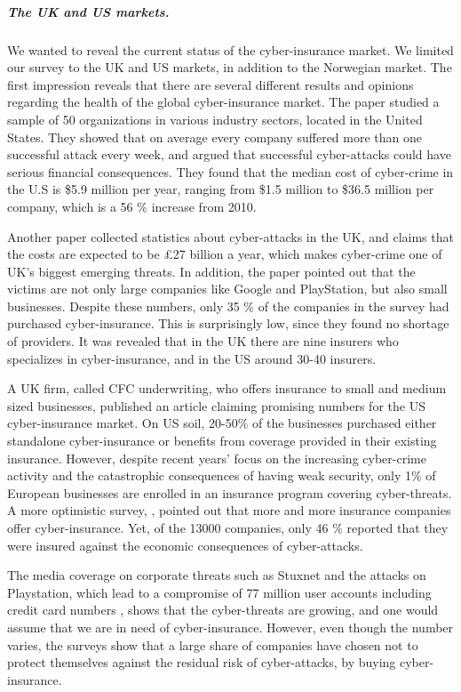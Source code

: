 \subparagraph{The UK and US markets.}
We wanted to reveal the current status of the cyber-insurance market. We limited our survey to the UK and US markets, in addition to the Norwegian market. 
The first impression reveals that there are several different results and opinions regarding the health of the global cyber-insurance market. 
The paper \cite{ccost} studied a sample of 50 organizations in various industry sectors, located in the United States. They showed that on average every company suffered more than one successful attack every week, and argued that successful cyber-attacks could have serious financial consequences. They found that the median cost of cyber-crime in the U.S is \$5.9 million per year, ranging from \$1.5 million to \$36.5 million per company, which is a 56 $\%$ increase from 2010. 
 
 Another paper \cite{evolvingcyber} collected statistics about cyber-attacks in the UK, and claims that the costs are expected to be \pounds 27 billion a year, which makes cyber-crime one of UK's biggest emerging threats. In addition, the paper pointed out that the victims are not only large companies like Google and PlayStation, but also small businesses. Despite these numbers, only 35 $\%$ of the companies in the survey had purchased cyber-insurance. This is surprisingly low, since they found no shortage of providers. It was revealed that in the UK there are nine insurers who specializes in cyber-insurance, and in the US around 30-40 insurers.  
 
 
A UK firm, called CFC underwriting, who offers insurance to small and medium sized businesses, published an article \cite{CFCunder} claiming promising numbers for the US cyber-insurance market.
On US soil, 20-50$\%$ of the businesses purchased either standalone cyber-insurance or benefits from coverage provided in their existing insurance. However, despite recent years' focus on the increasing cyber-crime activity and the catastrophic consequences of having weak security, only 1$\%$ of European businesses are enrolled in an insurance program covering cyber-threats.
A more optimistic survey, \cite{compworld}, pointed out that more and more insurance companies offer cyber-insurance. Yet, of the 13000 companies, only 46 $\%$ reported that they were insured against the economic consequences of cyber-attacks.
 
 The media coverage on corporate threats such as Stuxnet and the attacks on Playstation, which lead to a compromise of 77 million user accounts including credit card numbers \cite{playstation}, shows that the cyber-threats are growing, and one would assume that we are in need of cyber-insurance. However, even though the number varies, the surveys show that a large share of companies have chosen not to protect themselves against the residual risk of cyber-attacks, by buying cyber-insurance.

